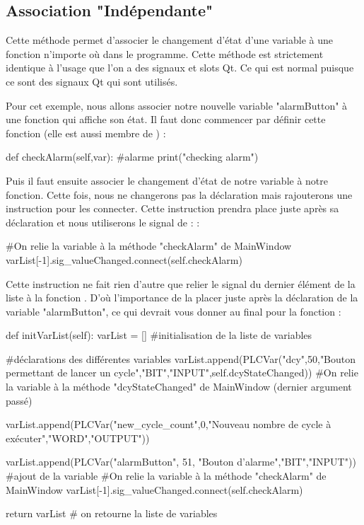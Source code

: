  \subsection{Association "Indépendante"}
 
 Cette méthode permet d'associer le changement d'état d'une variable à une fonction n'importe où dans le programme.
\newline
Cette méthode est strictement identique à l'usage que l'on a des signaux et slots Qt. Ce qui est normal puisque ce sont des signaux Qt qui sont utilisés.

  


Pour cet exemple, nous allons associer notre nouvelle variable "alarmButton" à une fonction qui affiche son état.\newline
Il faut donc commencer par définir cette fonction (elle est aussi membre de ) :
\begin{Python}
def checkAlarm(self,var):
		#alarme
		print("checking alarm")
\end{Python}

Puis il faut ensuite associer le changement d'état de notre variable à notre fonction. Cette fois, nous ne changerons pas la déclaration mais rajouterons une instruction pour les connecter.\newline
Cette instruction prendra place juste après sa déclaration et nous utiliserons le signal de  :  :
\begin{Python}
#On relie la variable à la méthode "checkAlarm" de MainWindow
varList[-1].sig_valueChanged.connect(self.checkAlarm)
\end{Python}
Cette instruction ne fait rien d'autre que relier le signal  du dernier élément de la liste  à la fonction .\newline
D'où l'importance de la placer juste après la déclaration de la variable "alarmButton", ce qui devrait vous donner au final pour la fonction  :

\begin{Python}
def initVarList(self):
	varList = []  #initialisation de la liste de variables


	#déclarations des différentes variables
	varList.append(PLCVar("dcy",50,"Bouton permettant de lancer un cycle","BIT","INPUT",self.dcyStateChanged))
	#On relie la variable à la méthode "dcyStateChanged" de MainWindow (dernier argument passé)

	varList.append(PLCVar("new_cycle_count",0,"Nouveau nombre de cycle à exécuter","WORD","OUTPUT"))

	varList.append(PLCVar("alarmButton", 51, "Bouton d'alarme","BIT","INPUT")) #ajout de la variable
	#On relie la variable à la méthode "checkAlarm" de MainWindow
	varList[-1].sig_valueChanged.connect(self.checkAlarm)

	return varList  # on retourne la liste de variables
\end{Python}



